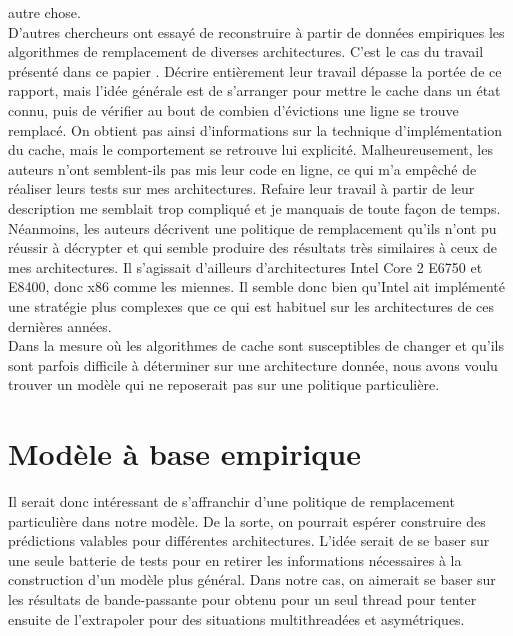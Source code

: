 \documentclass{report}
\begin{document}
autre chose. 
\\D'autres chercheurs ont essayé de reconstruire à partir de données empiriques
les algorithmes de remplacement de diverses architectures. C'est le cas du travail
présenté dans ce papier \cite{cachemodeling}. Décrire entièrement leur travail
dépasse la portée de ce rapport, mais l'idée générale est de s'arranger pour 
mettre le cache dans un état connu, puis de vérifier au bout de combien d'évictions
une ligne se trouve remplacé. On obtient pas ainsi d'informations sur la technique
d'implémentation du cache, mais le comportement se retrouve lui explicité. 
Malheureusement, les auteurs n'ont semblent-ils pas mis leur code en ligne, ce
qui m'a empêché de réaliser leurs tests sur mes architectures. Refaire leur 
travail à partir de leur description me semblait trop compliqué et je manquais de 
toute façon de temps. Néanmoins, les auteurs décrivent une politique de remplacement
qu'ils n'ont pu réussir à décrypter et qui semble produire des résultats très
similaires à ceux de mes architectures. Il s'agissait d'ailleurs d'architectures
Intel Core 2 E6750 et E8400, donc x86 comme les miennes. Il semble donc bien 
qu'Intel ait implémenté une stratégie plus complexes que ce qui est habituel sur
les architectures de ces dernières années.
\\Dans la mesure où les algorithmes de cache sont susceptibles de changer et qu'ils
sont parfois difficile à déterminer sur une architecture donnée, nous avons
voulu trouver un modèle qui ne reposerait pas sur une politique particulière.

\section{Modèle à base empirique}
Il serait donc intéressant de s'affranchir d'une politique de remplacement
particulière dans notre modèle. De la sorte, on pourrait espérer construire des prédictions
valables pour différentes architectures. L'idée serait de se baser sur une seule batterie
de tests pour en retirer les informations nécessaires à la construction d'un modèle plus
général. Dans notre cas, on aimerait se baser sur les résultats de bande-passante pour
obtenu pour un seul thread pour tenter ensuite de l'extrapoler pour des situations 
multithreadées et asymétriques. 
\end{document}
